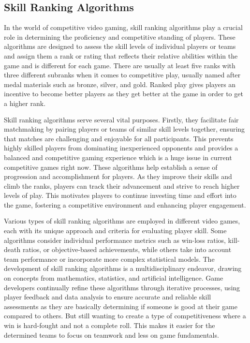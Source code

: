 \documentclass{article}
\theoremstyle{theorem}
\theoremstyle{definition}
\theoremstyle{remark}
\begin{document}
\subsection{Skill Ranking Algorithms}

\medskip\indent
In the world of competitive video gaming, skill ranking algorithms play a crucial role in determining the proficiency and competitive standing of players. These algorithms are designed to assess the skill levels of individual players or teams and assign them a rank or rating that reflects their relative abilities within the game and is different for each game. There are usually at least five ranks with three different subranks when it comes to competitive play, usually named after medal materials such as bronze, silver, and gold. Ranked play gives players an incentive to become better players as they get better at the game in order to get a higher rank.

\medskip\indent
Skill ranking algorithms serve several vital purposes. Firstly, they facilitate fair matchmaking by pairing players or teams of similar skill levels together, ensuring that matches are challenging and enjoyable for all participants. This prevents highly skilled players from dominating inexperienced opponents and provides a balanced and competitive gaming experience which is a huge issue in current competitive games right now. These algorithms help establish a sense of progression and accomplishment for players.\cite{Ptp} As they improve their skills and climb the ranks, players can track their advancement and strive to reach higher levels of play. This motivates players to continue investing time and effort into the game, fostering a competitive environment and enhancing player engagement.

\medskip\indent
Various types of skill ranking algorithms are employed in different video games, each with its unique approach and criteria for evaluating player skill. Some algorithms consider individual performance metrics such as win-loss ratios, kill-death ratios, or objective-based achievements, while others take into account team performance or incorporate more complex statistical models. The development of skill ranking algorithms is a multidisciplinary endeavor, drawing on concepts from mathematics, statistics, and artificial intelligence.\cite{Mga} Game developers continually refine these algorithms through iterative processes, using player feedback and data analysis to ensure accurate and reliable skill assessments as they are basically determining if someone is good at their game compared to others. But still wanting to create a type of competitiveness where a win is hard-fought and not a complete roll. This makes it easier for the determined teams to focus on teamwork and less on game fundamentals.
\end{document}
